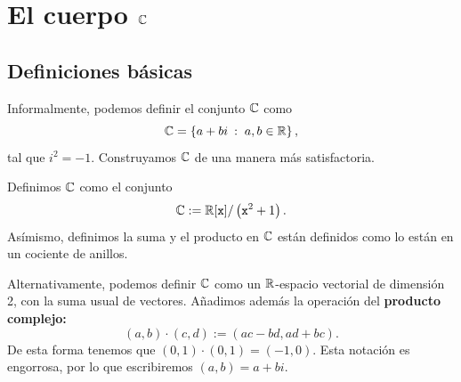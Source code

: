 \chapter{El cuerpo $\displaystyle \mathbb{C} $}
\section{Definiciones básicas}
Informalmente, podemos definir el conjunto $\displaystyle \mathbb{C} $ como
\[ \mathbb{C} = \left\{ a + bi \: : \; a,b \in \mathbb{R}\right\}  ,\]
tal que $\displaystyle i^{2}=-1 $. Construyamos $\displaystyle \mathbb{C} $ de una manera más satisfactoria.
\begin{definition}
Definimos $\displaystyle \mathbb{C} $ como el conjunto
\[ \mathbb{C} : = \mathbb{R}[\mathtt{x}] / \left(\mathtt{x}^{2} + 1\right).\]
Asímismo, definimos la suma y el producto en $\displaystyle \mathbb{C} $ están definidos como lo están en un cociente de anillos.
\end{definition}
Alternativamente, podemos definir $\displaystyle \mathbb{C} $ como un $\displaystyle \mathbb{R} $-espacio vectorial de dimensión 2, con la suma usual de vectores. Añadimos además la operación del \textbf{producto complejo:}
\[\left(a,b\right) \cdot \left(c,d\right) := \left(ac-bd, ad + bc\right) .\]
De esta forma tenemos que $\displaystyle \left(0,1\right) \cdot \left(0,1\right)=\left(-1, 0\right) $. Esta notación es engorrosa, por lo que escribiremos $\displaystyle \left(a,b\right)= a + bi $. 

